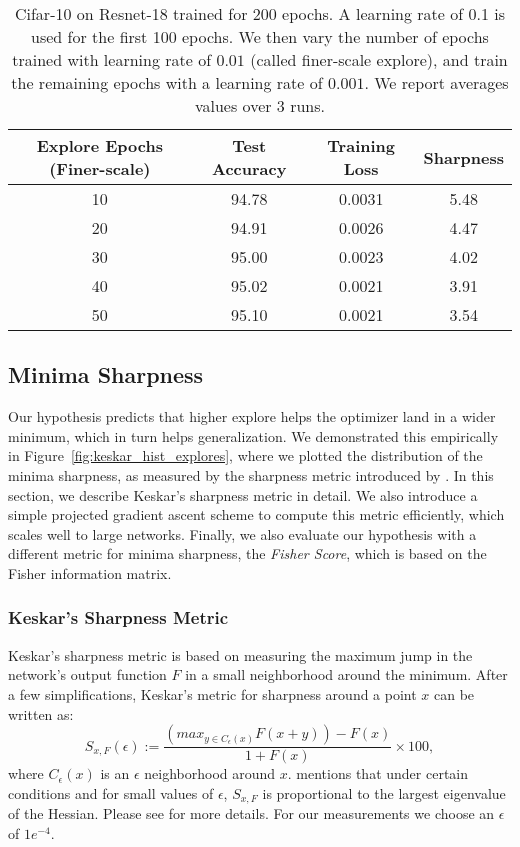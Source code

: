 \documentclass[twoside,11pt]{article}
\begin{document}
\begin{table}[h]
\small
\centering
\caption{Cifar-10 on Resnet-18 trained for 200 epochs. A learning rate of 0.1 is used for the first 100 epochs. We then vary the number of epochs trained with learning rate of $0.01$ (called finer-scale explore), and train the remaining epochs with a learning rate of $0.001$. We report averages values over 3 runs.}
\label{tab:finewarmup_accuracy_baseline}
\begin{tabular}{cccc}
\toprule
Explore Epochs (Finer-scale) & Test Accuracy & Training Loss & Sharpness \\
\midrule
  10 & 94.78 & 0.0031 & 5.48\\ 
  20 & 94.91 & 0.0026 & 4.47\\ 
  30 & 95.00 & 0.0023 & 4.02\\ 
  40 & 95.02 & 0.0021 & 3.91\\ 
  50 & 95.10 & 0.0021 & 3.54\\ 
\bottomrule
\end{tabular}
\end{table}
\vspace{-6pt}

\subsection{Minima Sharpness }
\label{sec:metrics_for_wide_minima}
Our hypothesis predicts that higher explore helps the optimizer land in a wider minimum, which in turn helps generalization. We demonstrated this empirically in Figure~\ref{fig:keskar_hist_explores}, where we plotted the distribution of the minima sharpness, as measured by the sharpness metric introduced by \citep{keskar2016large}. In this section, we describe Keskar's sharpness metric in detail.
We also introduce a simple projected gradient ascent scheme to compute this metric efficiently, which scales well to large networks. Finally, we also evaluate our hypothesis with a different metric for minima sharpness, the \textit{Fisher Score}, which is based on the Fisher information matrix.

\subsubsection{Keskar's Sharpness Metric}

Keskar's sharpness metric is based on measuring the maximum jump in the network's output function $F$ in a small neighborhood around the minimum. After a few simplifications, Keskar's metric for sharpness around a point $x$ can be written as:
\begin{equation} \label{eq:keskar_metric}
     S_{x,F}(\epsilon) := \frac{(max_{y \in  C_{\epsilon}(x)} F(x + y)) - F(x)}{1+ F(x)} \times 100,
\end{equation}
where $C_{\epsilon}(x)$ is an $\epsilon$ neighborhood around $x$. \cite{keskar2016large} mentions that under certain conditions and for small values of $\epsilon$, $S_{x,F}$ is proportional to the largest eigenvalue of the Hessian. Please see \cite{keskar2016large} for more details. For our measurements we choose an $\epsilon$ of $1e^{-4}$.
\end{document}
